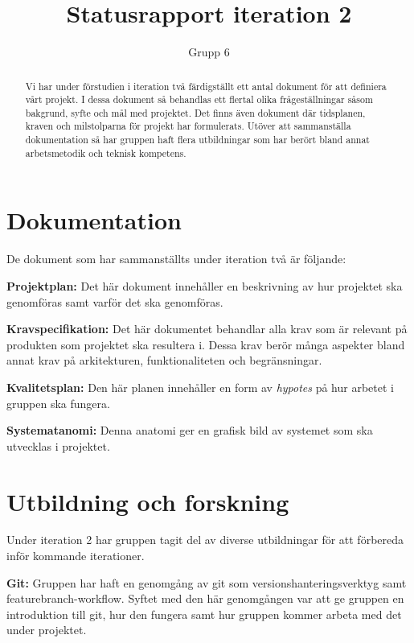 \documentclass[a4paper,10pt]{article}
\title{ Statusrapport iteration 2 }
\author{Grupp 6}
\begin{document}
\begin{titlingpage}
    \maketitle
    \begin{abstract}
    \noindent Vi har under förstudien i iteration två färdigställt ett antal dokument för att definiera vårt projekt. I dessa dokument så behandlas ett flertal olika frågeställningar såsom bakgrund, syfte och mål med projektet. Det finns även dokument där tidsplanen, kraven och milstolparna för projekt har formulerats. Utöver att sammanställa dokumentation så har gruppen haft flera utbildningar som har berört bland annat arbetsmetodik och teknisk kompetens.
    \end{abstract}
\end{titlingpage}

\section{Dokumentation}
\label{sec:Dokumentation}
De dokument som har sammanställts under iteration två är följande:

\textbf{Projektplan:} Det här dokument innehåller en beskrivning av hur projektet ska genomföras samt varför det ska genomföras.

\textbf{Kravspecifikation:} Det här dokumentet behandlar alla krav som är relevant på produkten som projektet ska resultera i. Dessa krav berör många aspekter bland annat krav på arkitekturen, funktionaliteten och begränsningar.

\textbf{Kvalitetsplan:} Den här planen innehåller en form av \emph{hypotes} på hur arbetet i gruppen ska fungera.

\textbf{Systematanomi:} Denna anatomi ger en grafisk bild av systemet som ska utvecklas i projektet.

\section{Utbildning och forskning}
\label{sec:Utbildning och forskning}
Under iteration 2 har gruppen tagit del av diverse utbildningar för att förbereda inför kommande iterationer.

\textbf{Git:} Gruppen har haft en genomgång av git som versionshanteringsverktyg samt featurebranch-workflow. Syftet med den här genomgången var att ge gruppen en introduktion till git, hur den fungera samt hur gruppen kommer arbeta med det under projektet.
\end{document}
